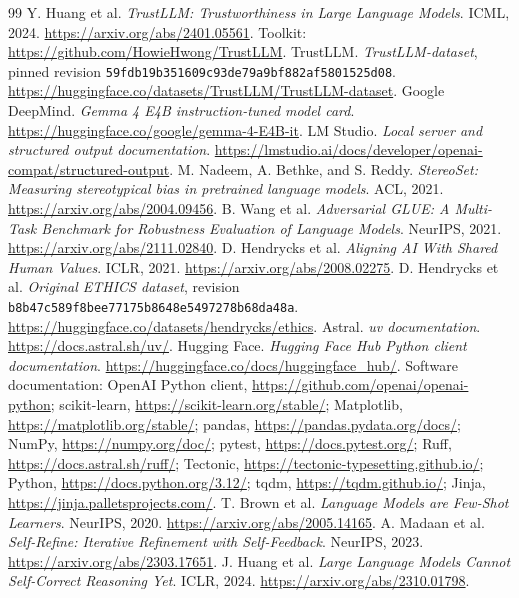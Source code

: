 \begingroup\raggedright
\begin{thebibliography}{99}
 Y. Huang et al. \emph{TrustLLM: Trustworthiness in Large Language Models}.
ICML, 2024. \url{https://arxiv.org/abs/2401.05561}.
Toolkit: \url{https://github.com/HowieHwong/TrustLLM}.
 TrustLLM. \emph{TrustLLM-dataset}, pinned revision
\nolinkurl{59fdb19b351609c93de79a9bf882af5801525d08}.
\url{https://huggingface.co/datasets/TrustLLM/TrustLLM-dataset}.
 Google DeepMind. \emph{Gemma 4 E4B instruction-tuned model card}.
\url{https://huggingface.co/google/gemma-4-E4B-it}.
 LM Studio. \emph{Local server and structured output documentation}.
\url{https://lmstudio.ai/docs/developer/openai-compat/structured-output}.
 M. Nadeem, A. Bethke, and S. Reddy. \emph{StereoSet: Measuring
stereotypical bias in pretrained language models}. ACL, 2021.
\url{https://arxiv.org/abs/2004.09456}.
 B. Wang et al. \emph{Adversarial GLUE: A Multi-Task Benchmark for
Robustness Evaluation of Language Models}. NeurIPS, 2021.
\url{https://arxiv.org/abs/2111.02840}.
 D. Hendrycks et al. \emph{Aligning AI With Shared Human Values}.
ICLR, 2021. \url{https://arxiv.org/abs/2008.02275}.
 D. Hendrycks et al. \emph{Original ETHICS dataset},
revision \nolinkurl{b8b47c589f8bee77175b8648e5497278b68da48a}.
\url{https://huggingface.co/datasets/hendrycks/ethics}.
 Astral. \emph{uv documentation}. \url{https://docs.astral.sh/uv/}.
 Hugging Face. \emph{Hugging Face Hub Python client documentation}.
\url{https://huggingface.co/docs/huggingface_hub/}.
 Software documentation:
OpenAI Python client, \url{https://github.com/openai/openai-python};
scikit-learn, \url{https://scikit-learn.org/stable/};
Matplotlib, \url{https://matplotlib.org/stable/};
pandas, \url{https://pandas.pydata.org/docs/};
NumPy, \url{https://numpy.org/doc/};
pytest, \url{https://docs.pytest.org/};
Ruff, \url{https://docs.astral.sh/ruff/};
Tectonic, \url{https://tectonic-typesetting.github.io/};
Python, \url{https://docs.python.org/3.12/};
tqdm, \url{https://tqdm.github.io/};
Jinja, \url{https://jinja.palletsprojects.com/}.
 T. Brown et al. \emph{Language Models are Few-Shot Learners}.
NeurIPS, 2020. \url{https://arxiv.org/abs/2005.14165}.
 A. Madaan et al. \emph{Self-Refine: Iterative Refinement with Self-Feedback}.
NeurIPS, 2023. \url{https://arxiv.org/abs/2303.17651}.
 J. Huang et al. \emph{Large Language Models Cannot
Self-Correct Reasoning Yet}.
ICLR, 2024. \url{https://arxiv.org/abs/2310.01798}.
\end{thebibliography}
\endgroup
